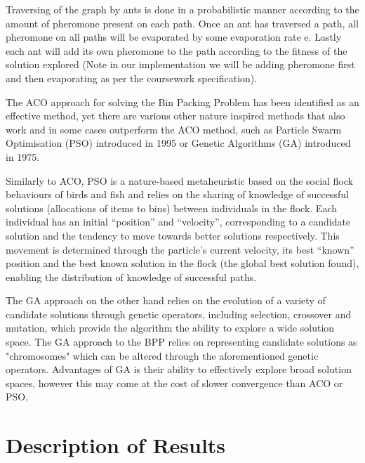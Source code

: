 \documentclass[sigconf]{acmart}
\begin{document}
        Traversing of the graph by ants is done in a probabilistic manner according to the amount of pheromone present on each path. Once an ant has traversed a path, all pheromone on all paths will be evaporated by some evaporation rate e. Lastly each ant will add its own pheromone to the path according to the fitness of the solution explored (Note in our implementation we will be adding pheromone first and then evaporating as per the coursework specification).\newline

        The ACO approach for solving the Bin Packing Problem has been identified as an effective method, yet there are various other nature inspired methods that also work and in some cases outperform the ACO method, such as Particle Swarm Optimisation (PSO) introduced in 1995\cite{Eberhart1995ANO} or Genetic Algorithms (GA) introduced in 1975\cite{holland1992adaptation}.\newline
        
        Similarly to ACO, PSO is a nature-based metaheuristic based on the social flock behaviours of birds and fish and relies on the sharing of knowledge of successful solutions (allocations of items to bins) between individuals in the flock. Each individual has an initial “position” and “velocity”, corresponding to a candidate solution and the tendency to move towards better solutions respectively. This movement is determined through the particle’s current velocity, its best “known” position and the best known solution in the flock (the global best solution found), enabling the distribution of knowledge of successful paths.\newline

        The GA approach on the other hand relies on the evolution of a variety of candidate solutions through genetic operators, including selection, crossover and mutation, which provide the algorithm the ability to explore a wide solution space. The GA approach to the BPP relies on representing candidate solutions as "chromosomes" which can be altered through the aforementioned genetic operators. Advantages of GA is their ability to effectively explore broad solution spaces, however this may come at the cost of slower convergence than ACO or PSO.\newline
        
    \section{Description of Results}
\end{document}
